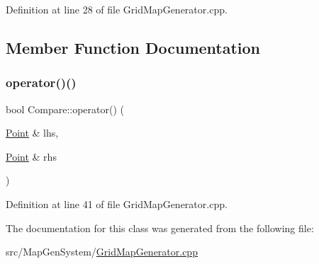 Definition at line 28 of file Grid\+Map\+Generator.\+cpp.



\subsection{Member Function Documentation}
\mbox{\label{class_compare_ad6580c74acb6c4953248f062cffe4814}} 
\subsubsection{\texorpdfstring{operator()()}{operator()()}}
{\footnotesize\ttfamily bool Compare\+::operator() (\begin{DoxyParamCaption}\item[{\mbox{\hyperlink{namespace_world_architect_afe984ab247ed2917d3a738c7d83d33ca}{Point}} \&}]{lhs,  }\item[{\mbox{\hyperlink{namespace_world_architect_afe984ab247ed2917d3a738c7d83d33ca}{Point}} \&}]{rhs }\end{DoxyParamCaption})\hspace{0.3cm}{\ttfamily [inline]}}



Definition at line 41 of file Grid\+Map\+Generator.\+cpp.



The documentation for this class was generated from the following file\+:\begin{DoxyCompactItemize}
\item 
src/\+Map\+Gen\+System/\mbox{\hyperlink{_grid_map_generator_8cpp}{Grid\+Map\+Generator.\+cpp}}\end{DoxyCompactItemize}
